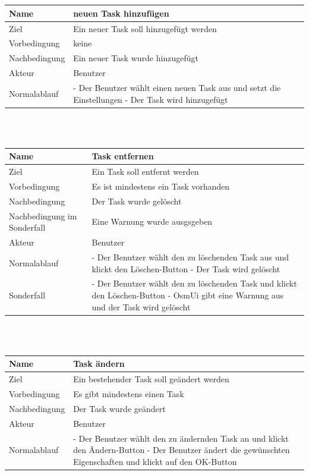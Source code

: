 \documentclass[a4paper,10pt]{scrartcl}
\begin{document}
\\
\\
\begin{tabular}{|p{5cm}|p{10cm}|}
\hline Name & \textbf{neuen Task hinzufügen} \\ 
\hline Ziel & Ein neuer Task soll hinzugefügt werden \\ 
\hline Vorbedingung & keine \\ 
\hline Nachbedingung & Ein neuer Task wurde hinzugefügt \\ 
\hline Akteur & Benutzer \\ 
\hline Normalablauf & - Der Benutzer wählt einen neuen Task aus und setzt die Einstellungen
\newline
- Der Task wird hinzugefügt
\\ 
\hline 
\end{tabular}
\\
\\
\begin{tabular}{|p{5cm}|p{10cm}|}
\hline Name & \textbf{Task entfernen} \\ 
\hline Ziel & Ein Task soll entfernt werden \\ 
\hline Vorbedingung & Es ist mindestens ein Task vorhanden \\ 
\hline Nachbedingung & Der Task wurde gelöscht \\ 
\hline Nachbedingung im Sonderfall & Eine Warnung wurde ausgsgeben \\ 
\hline Akteur & Benutzer \\ 
\hline Normalablauf & - Der Benutzer wählt den zu löschenden Task aus und klickt den Löschen-Button
\newline
- Der Task wird gelöscht
\\ 
\hline Sonderfall & - Der Benutzer wählt den zu löschenden Task und klickt den Löschen-Button
\newline
- OsmUi gibt eine Warnung aus und der Task wird gelöscht
 \\ 
\hline 
\end{tabular}  
\\
\\\begin{tabular}{|p{5cm}|p{10cm}|}
\hline Name & \textbf{Task ändern} \\ 
\hline Ziel & Ein bestehender Task soll geändert werden \\ 
\hline Vorbedingung & Es gibt mindestens einen Task \\ 
\hline Nachbedingung & Der Task wurde geändert \\  
\hline Akteur & Benutzer \\ 
\hline Normalablauf & - Der Benutzer wählt den zu ändernden Task an und klickt den Ändern-Button
\newline
- Der Benutzer ändert die gewünschten Eigenschaften und klickt auf den OK-Button
\\ 
\hline 
\end{tabular} 
\end{document}
